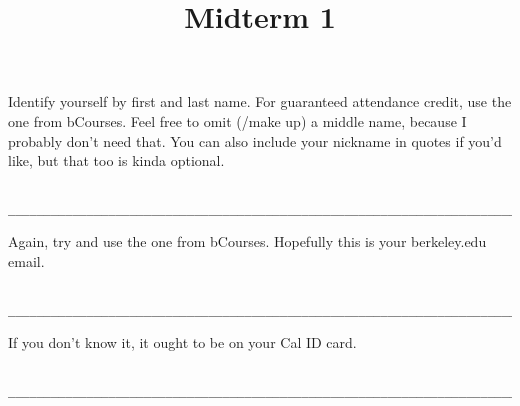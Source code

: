 \documentclass[twoside]{article}
\title{\sc Midterm 1}
\begin{document}
\thispagestyle{empty}
\maketitle

\begin{enumerate}

Identify yourself by first and last name. For guaranteed attendance credit, use the one from bCourses. Feel free to omit (/make up) a middle name, because I probably don't need that. You can also include your nickname in quotes if you'd like, but that too is kinda optional.

\begin{lstlisting}

__________________________________________________________________________
\end{lstlisting}


Again, try and use the one from bCourses. Hopefully this is your berkeley.edu email.

\begin{lstlisting}

__________________________________________________________________________
\end{lstlisting}


If you don't know it, it ought to be on your Cal ID card.

\begin{lstlisting}

__________________________________________________________________________
\end{lstlisting}


\end{enumerate}
\end{document}
